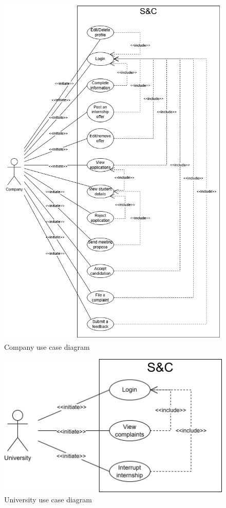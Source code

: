 \begin{figure}[H]
    \centering
    \includegraphics[width=0.9\linewidth]{Images/use case diagrams/COMPANY.png}
    \caption{Company use case diagram}
    \label{fig:enter-label}
\end{figure}

\begin{figure}[H]
    \centering
    \includegraphics[width=0.8\linewidth]{Images/use case diagrams/UNIVERSITY.png}
    \caption{University use case diagram}
    \label{fig:enter-label}
\end{figure}

